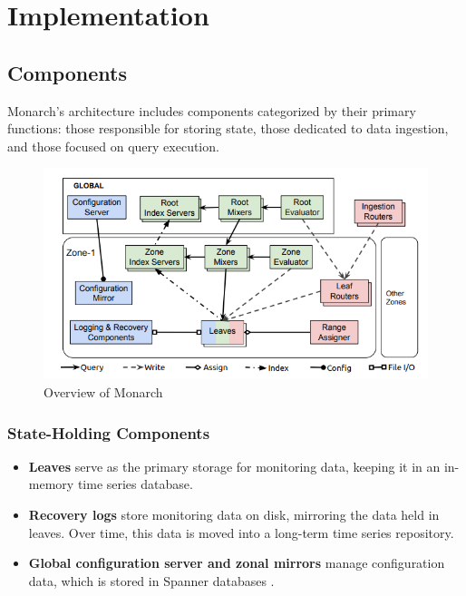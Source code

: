


\section{Implementation}

\subsection{Components}

Monarch's architecture includes components categorized by their primary functions: those responsible for storing state, those dedicated to data ingestion, and those focused on query execution.

\begin{figure}[h]
    \centering
    \includegraphics[width=1\textwidth]{pics/monarch.png} %
    \caption{Overview of Monarch \cite{50652}}
\end{figure}

\subsubsection*{State-Holding Components}

\begin{itemize}
    \item \textbf{Leaves} serve as the primary storage for monitoring data, keeping it in an in-memory time series database.
    \item \textbf{Recovery logs} store monitoring data on disk, mirroring the data held in leaves. Over time, this data is moved into a long-term time series repository.
    \item \textbf{Global configuration server and zonal mirrors} manage configuration data, which is stored in Spanner databases \cite{50652}.
\end{itemize}


